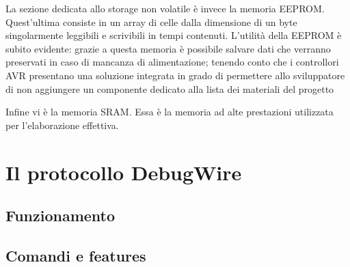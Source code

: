 La sezione dedicata allo storage non volatile è invece la memoria EEPROM. Quest'ultima consiste in un array di celle dalla dimensione di un byte singolarmente leggibili e scrivibili in tempi contenuti.
L'utilità della EEPROM è subito evidente: grazie a questa memoria è possibile salvare dati che verranno preservati in caso di mancanza di alimentazione; tenendo conto che i controllori AVR presentano una soluzione integrata in grado di permettere allo sviluppatore di non aggiungere un componente dedicato alla lista dei materiali del progetto

Infine vi è la memoria SRAM. Essa è la memoria ad alte prestazioni utilizzata per l'elaborazione effettiva.


\section{Il protocollo DebugWire}
\subsection{Funzionamento}
\subsection{Comandi e features}